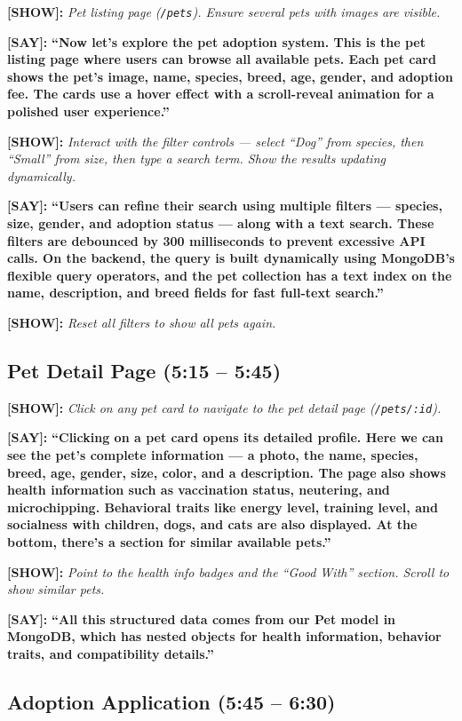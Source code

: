 \documentclass[12pt,a4paper]{article}
\newcommand{\say}[1]{\textbf{\textcolor{narration}{[SAY]:}} \textbf{``#1''}}
\newcommand{\show}[1]{\textbf{\textcolor{screen}{[SHOW]:}} \textit{#1}}
\begin{document}
\show{Pet listing page (\texttt{/pets}). Ensure several pets with images are visible.}

\say{Now let's explore the pet adoption system. This is the pet listing page where users can browse all available pets. Each pet card shows the pet's image, name, species, breed, age, gender, and adoption fee. The cards use a hover effect with a scroll-reveal animation for a polished user experience.}

\show{Interact with the filter controls --- select ``Dog'' from species, then ``Small'' from size, then type a search term. Show the results updating dynamically.}

\say{Users can refine their search using multiple filters --- species, size, gender, and adoption status --- along with a text search. These filters are debounced by 300 milliseconds to prevent excessive API calls. On the backend, the query is built dynamically using MongoDB's flexible query operators, and the pet collection has a text index on the name, description, and breed fields for fast full-text search.}

\show{Reset all filters to show all pets again.}

\subsection{Pet Detail Page (5:15 -- 5:45)}

\show{Click on any pet card to navigate to the pet detail page (\texttt{/pets/:id}).}

\say{Clicking on a pet card opens its detailed profile. Here we can see the pet's complete information --- a photo, the name, species, breed, age, gender, size, color, and a description. The page also shows health information such as vaccination status, neutering, and microchipping. Behavioral traits like energy level, training level, and socialness with children, dogs, and cats are also displayed. At the bottom, there's a section for similar available pets.}

\show{Point to the health info badges and the ``Good With'' section. Scroll to show similar pets.}

\say{All this structured data comes from our Pet model in MongoDB, which has nested objects for health information, behavior traits, and compatibility details.}

\subsection{Adoption Application (5:45 -- 6:30)}
\end{document}
